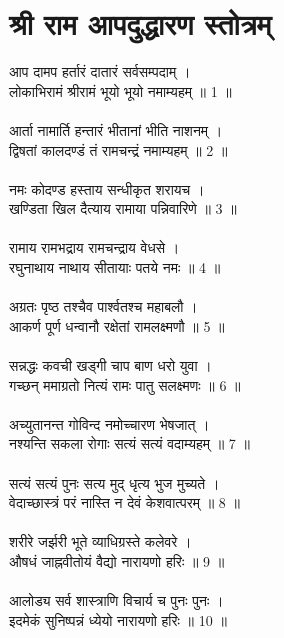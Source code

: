 \section{श्री राम आपदुद्धारण स्तोत्रम्}
आप दामप हर्तारं दातारं सर्वसम्पदाम् ।\\
लोकाभिरामं श्रीरामं भूयो भूयो नमाम्यहम् ॥ 1 ॥\\
\\
आर्ता नामार्ति हन्तारं भीतानां भीति नाशनम् ।\\
द्विषतां कालदण्डं तं रामचन्द्रं नमाम्यहम् ॥ 2 ॥\\
\\
नमः कोदण्ड हस्ताय सन्धीकृत शरायच ।\\
खण्डिता खिल दैत्याय रामाया पन्निवारिणे ॥ 3 ॥\\
\\
रामाय रामभद्राय रामचन्द्राय वेधसे ।\\
रघुनाथाय नाथाय सीतायाः पतये नमः ॥ 4 ॥\\
\\
अग्रतः पृष्ठ तश्चैव पार्श्वतश्च महाबलौ ।\\
आकर्ण पूर्ण धन्वानौ रक्षेतां रामलक्ष्मणौ ॥ 5 ॥\\
\\
सन्नद्धः कवची खड्गी चाप बाण धरो युवा ।\\
गच्छन् ममाग्रतो नित्यं रामः पातु सलक्ष्मणः ॥ 6 ॥\\
\\
अच्युतानन्त गोविन्द नमोच्चारण भेषजात् ।\\
नश्यन्ति सकला रोगाः सत्यं सत्यं वदाम्यहम् ॥ 7 ॥\\
\\
सत्यं सत्यं पुनः सत्य मुद् धृत्य भुज मुच्यते ।\\
वेदाच्छास्त्रं परं नास्ति न देवं केशवात्परम् ॥ 8 ॥\\
\\
शरीरे जर्झरी भूते व्याधिग्रस्ते कलेवरे ।\\
औषधं जाह्नवीतोयं वैद्यो नारायणो हरिः ॥ 9 ॥\\
\\
आलोड्य सर्व शास्त्राणि विचार्य च पुनः पुनः ।\\
इदमेकं सुनिष्पन्नं ध्येयो नारायणो हरिः ॥ 10 ॥\\
